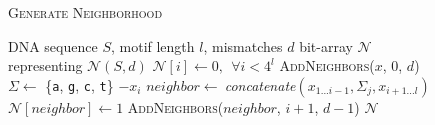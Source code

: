 \begin{figure}[b]
	\noindent \hspace*{6pt}{\bf Algorithm 2} \textsc{Generate Neighborhood}
	\begin{algorithmic}[1]
		\label{alg:recursive-nbr-gen}
		\Require DNA sequence $S$, motif length $l$, mismatches $d$
		\Ensure bit-array $\mathcal{N}$ representing $\mathcal{N}(S,d)$ \vspace*{6pt}
		\State $\mathcal{N}[i] \leftarrow 0,\ \ \forall i < 4^{l}$ 
			\State \textsc{AddNeighbors}($x$, 0, $d$) \hspace*{9pt}
		\EndFor
		\State {}
				\State $\Sigma \leftarrow$ \{\texttt{a}, \texttt{g}, \texttt{c}, \texttt{t}\} $- x_{i}$ \hspace*{6pt}
					\State $neighbor \leftarrow\ ${\em\small concatenate}$(x_{1...i-1},\Sigma_{j},x_{i+1...l})$
					\State $\mathcal{N}[neighbor] \leftarrow 1$
						\State \textsc{AddNeighbors}($neighbor$, $i+1$, $d-1$)
					\EndIf
				\EndFor
			\EndFor
		\EndProcedure
		\State\Return $\mathcal{N}$
	\end{algorithmic}
\end{figure}